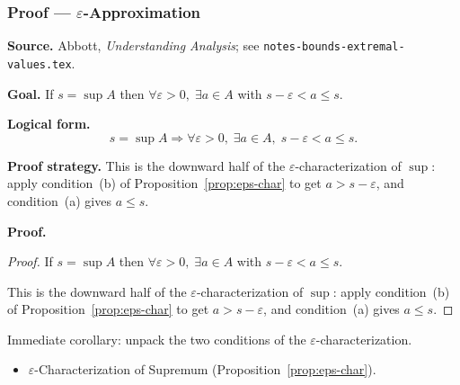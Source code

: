 
\clearpage
{}
\hypertarget{proof-RA-ABB-C-eps-approximation}{}

\subsubsection[$\varepsilon$-Approximation]{Proof --- $\varepsilon$-Approximation}

\bigskip

\noindent
\textbf{Source.}
Abbott, \emph{Understanding Analysis}; see \texttt{notes-bounds-extremal-values.tex}.

\vspace{0.75em}

\noindent
\textbf{Goal.}
If $s = \sup A$ then $\forall \varepsilon > 0,\; \exists a \in A$ with $s - \varepsilon < a \le s$.

\vspace{0.75em}

\noindent
\textbf{Logical form.}
\[
  s = \sup A \Rightarrow \forall \varepsilon > 0,\; \exists a \in A,\; s - \varepsilon < a \le s.
\]

\vspace{0.75em}

\noindent
\textbf{Proof strategy.}
This is the downward half of the $\varepsilon$-characterization of $\sup$: apply condition~(b) of Proposition~\ref{prop:eps-char} to get $a > s - \varepsilon$, and condition~(a) gives $a \le s$.

\vspace{0.75em}

\noindent
\textbf{Proof.}
\begin{proof}
\Claim If $s = \sup A$ then $\forall \varepsilon > 0,\; \exists a \in A$ with $s - \varepsilon < a \le s$.

\Given 

\Goal 

\Strategy This is the downward half of the $\varepsilon$-characterization of $\sup$: apply condition~(b) of Proposition~\ref{prop:eps-char} to get $a > s - \varepsilon$, and condition~(a) gives $a \le s$.

\medskip


\end{proof}

\begin{remark*}
Immediate corollary: unpack the two conditions of the $\varepsilon$-characterization.
\end{remark*}

\begin{remark*}[Dependencies]
\begin{itemize}
  \item $\varepsilon$-Characterization of Supremum (Proposition~\ref{prop:eps-char}).
\end{itemize}
\end{remark*}
